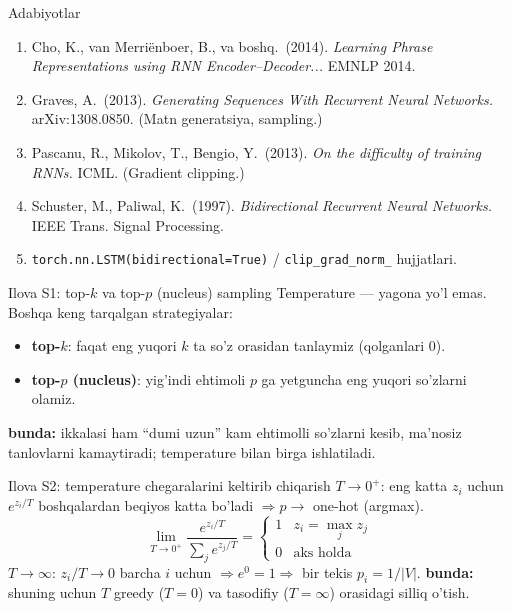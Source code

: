 \documentclass[aspectratio=169,11pt]{beamer}
\newcommand{\bunda}[1]{{\small\textbf{bunda:}\; #1}}
\begin{document}
\begin{frame}{Adabiyotlar}
  \begin{enumerate}\small\setlength\itemsep{5pt}
    \item Cho, K., van Merri\"enboer, B., va boshq.\ (2014). \textit{Learning Phrase
          Representations using RNN Encoder--Decoder...} EMNLP 2014.
    \item Graves, A.\ (2013). \textit{Generating Sequences With Recurrent Neural
          Networks.} arXiv:1308.0850. (Matn generatsiya, sampling.)
    \item Pascanu, R., Mikolov, T., Bengio, Y.\ (2013). \textit{On the difficulty of
          training RNNs.} ICML. (Gradient clipping.)
    \item Schuster, M., Paliwal, K.\ (1997). \textit{Bidirectional Recurrent Neural
          Networks.} IEEE Trans. Signal Processing.
    \item \texttt{torch.nn.LSTM(bidirectional=True)} / \texttt{clip\_grad\_norm\_} hujjatlari.
  \end{enumerate}
\end{frame}

\appendix

\begin{frame}{Ilova S1: top-$k$ va top-$p$ (nucleus) sampling}
  \small
  Temperature --- yagona yo'l emas. Boshqa keng tarqalgan strategiyalar:
  \begin{itemize}\setlength\itemsep{2pt}
    \item \textbf{top-$k$}: faqat eng yuqori $k$ ta so'z orasidan tanlaymiz (qolganlari $0$).
    \item \textbf{top-$p$ (nucleus)}: yig'indi ehtimoli $p$ ga yetguncha eng yuqori
          so'zlarni olamiz.
  \end{itemize}
  \bunda{ikkalasi ham ``dumi uzun'' kam ehtimolli so'zlarni kesib, ma'nosiz tanlovlarni
  kamaytiradi; temperature bilan birga ishlatiladi.}
\end{frame}

\begin{frame}{Ilova S2: temperature chegaralarini keltirib chiqarish}
  \small
  $T\to 0^{+}$: eng katta $z_i$ uchun $e^{z_i/T}$ boshqalardan beqiyos katta bo'ladi
  $\Rightarrow p\to$ one-hot (argmax).
  $$ \lim_{T\to 0^{+}} \frac{e^{z_i/T}}{\sum_j e^{z_j/T}}
     = \begin{cases} 1 & z_i = \max_j z_j\\ 0 & \text{aks holda}\end{cases} $$
  $T\to\infty$: $z_i/T\to 0$ barcha $i$ uchun $\Rightarrow e^{0}=1 \Rightarrow$ bir tekis
  $p_i = 1/|V|$.
  \bunda{shuning uchun $T$ greedy ($T{=}0$) va tasodifiy ($T{=}\infty$) orasidagi silliq
  o'tish.}
\end{frame}
\end{document}
